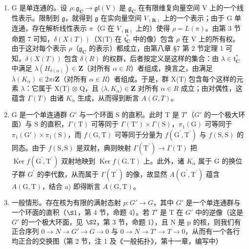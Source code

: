 \begin{enumerate}
\def\labelenumi{\alph{enumi})}
\item
  G 是单连通的。设 \(\rho : \mathfrak{g}_{\mathbf{C}} \to \mathfrak{gl}(\mathrm{V})\) 是 \(\mathfrak{g}_{\mathbf{C}}\) 在有限维复向量空间 V 上的一个线性表示。限制到 \(\mathfrak{g}\)，就得到 \(\mathfrak{g}\) 在实向量空间 \(V_{(\mathbf{R})}\) 上的一个表示；由于 G 单连通，存在解析线性表示 \(\pi\)（G 在 \(V_{(\mathbf{R})}\) 上的）使得 \(\rho = L(\pi)\)。由第 3 节命题 7 可知，\(\delta(X(T))\)（X(T) 在 \(\mathfrak{t}_{\mathbf{C}}^{*}\) 中的像）包含 \(\rho\) 在 V 上的所有权。由于这对每个表示 \(\rho\)（\(\mathfrak{g}_{\mathbf{C}}\) 的表示）都成立，由第八章 §7 第 2 节定理 1 可知，\(\delta(X(T))\) 包含 \(\delta(R)\) 的权群，后者按定义是这样的集合：由 \(\lambda \in \mathfrak{t}_{\mathbf{C}}^{*}\) 中满足 \(\lambda(H_{\delta(\alpha)}) \in \mathbf{Z}\)（对所有 \(\alpha \in R\)）者组成，换言之，由满足 \(\lambda(K_{\alpha}) \in 2\pi i\mathbf{Z}\)（对所有 \(\alpha \in R\)）者组成。于是，群 X(T) 包含每个这样的元素 \(\lambda\)：它属于 X(T) \(\otimes\) Q，且 \(\langle\lambda, K_{\alpha} \rangle \in \mathbf{Z}\) 对所有 \(\alpha \in R\) 成立；由对偶性，这蕴含 \(\Gamma(T)\) 由诸 \(K_{\alpha}\) 生成，从而得到断言 \(A(G,T)\)。
\item
  G 是一个单连通群 \(G'\) 与一个环面 S 的直积。此时 T 是 \(T'\)（\(G'\) 的一个极大环面）与 S 的直积，\(\varGamma(\mathrm{T})\) 可等同于 \(\varGamma(\mathrm{T}')\times\varGamma(\mathrm{S})\)，\(\pi_{1}(\mathrm{G})\) 可等同于 \(\pi_{1}(\mathrm{G}')\times\pi_{1}(\mathrm{S})\)，而 \(f(\mathrm{G},\mathrm{T})\) 可等同于分量为 \(f(\mathrm{G}^{\prime},\mathrm{T}^{\prime})\) 与 \(f(\mathrm{S},\mathrm{S})\) 的同态。由于 \(f(\mathrm{S},\mathrm{S})\) 是双射，典则映射 \(\varGamma(\mathrm{T}^{\prime})\to\varGamma(\mathrm{T})\) 把 \(\operatorname{Ker}f(\mathrm{G}^{\prime},\mathrm{T}^{\prime})\) 双射地映到 \(\operatorname{Ker}f(\mathrm{G},\mathrm{T})\) 上。此外，诸 \(K_{\alpha}\) 属于 G 的换位子群 \(G^{\prime}\) 的李代数，从而属于 \(\varGamma(\mathrm{T}^{\prime})\) 的像，故显然 \(A(\mathrm{G}^{\prime},\mathrm{T}^{\prime})\) 蕴含 \(A(\mathrm{G},\mathrm{T})\)，结合 a) 即得断言 \(A(\mathrm{G},\mathrm{T})\)。
\item
  一般情形。存在核为有限的满射态射 \(p : G' \to G\)，其中 \(G'\) 是一个单连通群与一个环面的直积（\(\S1\)，第 4 节，命题 4）。若 \(T'\) 是 T 在 \(G'\) 中的逆像（这是 \(G'\) 的一个极大环面，见 \(\S2\)，第 3 节，命题 1），且 N 是 p 的核，则我们有正合序列 \(0 \to N \to G' \to G \to 0\) 与 \(0 \to N \to T' \to T \to 0\)，从而有一个各行均正合的交换图（第 2 节，注 1 及《一般拓扑》，第十一章，编写中）
\end{enumerate}


